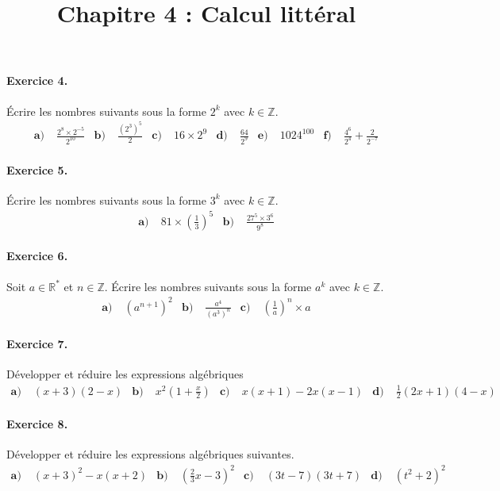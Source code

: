 \documentclass[11pt]{article}
\title{Chapitre 4 : Calcul littéral}
\date{}
\author{}
\begin{document}

\paragraph{Exercice 4.} Écrire les nombres suivants sous la forme $2^k$ avec
$k\in\mathbb{Z}$.
\begin{align*}
  \textbf{a)}\;&\frac{2^8\times2^{-5}}{2^{10}} &
  \textbf{b)}\;&\frac{(2^3)^5}{2} &
  \textbf{c)}\;&16\times2^9 &
  \textbf{d)}\;&\frac{64}{2^9} &
  \textbf{e)}\;&1024^{100} &
  \textbf{f)}\;&\frac{4^6}{2^4}+\frac{2}{2^{-7}}
\end{align*}

\paragraph{Exercice 5.} Écrire les nombres suivants sous la forme $3^k$ avec
$k\in\mathbb{Z}$.
\begin{align*}
  \textbf{a)}\;& 81\times\left( \frac{1}{3} \right)^5 &
  \textbf{b)}\;& \frac{27^5\times3^6}{9^8}
\end{align*}

\paragraph{Exercice 6.} Soit $a\in\mathbb{R}^*$ et $n\in\mathbb{Z}$. Écrire les nombres suivants sous la forme $a^k$ avec
$k\in\mathbb{Z}$.
\begin{align*}
  \textbf{a)}\;& \left( a^{n+1} \right)^2 &
  \textbf{b)}\;& \frac{a^4}{(a^3)^n} &
  \textbf{c)}\;& \left( \frac{1}{a} \right)^n\times a
\end{align*}

\paragraph{Exercice 7.} Développer et réduire les expressions algébriques
\begin{align*}
  \textbf{a)}\;& (x+3)(2-x) &
  \textbf{b)}\;& x^2\left( 1+\frac{x}{2} \right) &
  \textbf{c)}\;& x(x+1)-2x(x-1) &
  \textbf{d)}\;& \frac{1}{2}\left( 2x+1 \right)\left( 4-x \right)
\end{align*}

\paragraph{Exercice 8.} Développer et réduire les expressions algébriques
suivantes.
\begin{align*}
  \textbf{a)}\;& (x+3)^2-x(x+2) &
  \textbf{b)}\;& \left(\frac{2}{3}x-3\right)^2 &
  \textbf{c)}\;& (3t-7)(3t+7) &
  \textbf{d)}\;& (t^2+2)^2
\end{align*}
\end{document}
